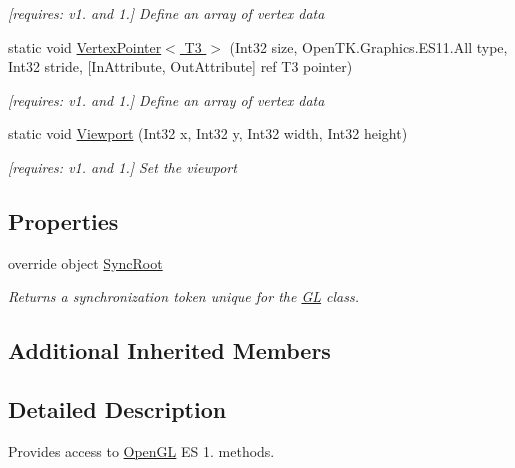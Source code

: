 \begin{DoxyCompactItemize}
\begin{DoxyCompactList}\small\item\em \mbox{[}requires\-: v1. and 1.\mbox{]} Define an array of vertex data \end{DoxyCompactList}\item 
static void \hyperlink{class_open_t_k_1_1_graphics_1_1_e_s11_1_1_g_l_a3349d1832f5757a878d62528861a6170}{Vertex\-Pointer$<$ T3 $>$} (Int32 size, Open\-T\-K.\-Graphics.\-E\-S11.\-All type, Int32 stride, \mbox{[}In\-Attribute, Out\-Attribute\mbox{]} ref T3 pointer)
\begin{DoxyCompactList}\small\item\em \mbox{[}requires\-: v1. and 1.\mbox{]} Define an array of vertex data \end{DoxyCompactList}\item 
static void \hyperlink{class_open_t_k_1_1_graphics_1_1_e_s11_1_1_g_l_ad044d41bc6b9d2e9ccc618488cfe76a3}{Viewport} (Int32 x, Int32 y, Int32 width, Int32 height)
\begin{DoxyCompactList}\small\item\em \mbox{[}requires\-: v1. and 1.\mbox{]} Set the viewport \end{DoxyCompactList}\end{DoxyCompactItemize}
\subsection*{Properties}
\begin{DoxyCompactItemize}
\item 
override object \hyperlink{class_open_t_k_1_1_graphics_1_1_e_s11_1_1_g_l_a3e9dec98d8cd98534b030c049c29420d}{Sync\-Root}
\begin{DoxyCompactList}\small\item\em Returns a synchronization token unique for the \hyperlink{class_open_t_k_1_1_graphics_1_1_e_s11_1_1_g_l}{G\-L} class. \end{DoxyCompactList}\end{DoxyCompactItemize}
\subsection*{Additional Inherited Members}


\subsection{Detailed Description}
Provides access to \hyperlink{namespace_open_t_k_1_1_graphics_1_1_open_g_l}{Open\-G\-L} E\-S 1. methods. 



